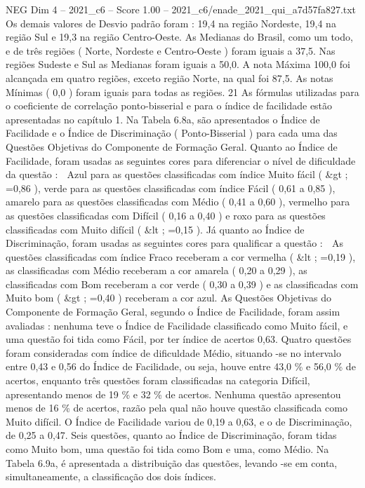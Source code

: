 \begin{textsample}{NEG Dim 4 – 2021\_c6 – Score 1.00 – 2021\_c6/enade\_2021\_qui\_a7d57fa827.txt}
Os demais valores de Desvio padrão foram : 19,4 na região Nordeste, 19,4 na região Sul e 19,3 na região Centro-Oeste.
As Medianas do Brasil, como um todo, e de três regiões ( Norte, Nordeste e Centro-Oeste ) foram iguais a 37,5.
Nas regiões Sudeste e Sul as Medianas foram iguais a 50,0.
A nota Máxima 100,0 foi alcançada em quatro regiões, exceto região Norte, na qual foi 87,5.
As notas Mínimas ( 0,0 ) foram iguais para todas as regiões. 21 As fórmulas utilizadas para o coeficiente de correlação ponto-bisserial e para o índice de facilidade estão apresentadas no capítulo 1.
Na Tabela 6.8a, são apresentados o Índice de Facilidade e o Índice de Discriminação ( Ponto-Bisserial ) para cada uma das Questões Objetivas do Componente de Formação Geral.
Quanto ao Índice de Facilidade, foram usadas as seguintes cores para diferenciar o nível de dificuldade da questão :  Azul para as questões classificadas com índice Muito fácil ( \&gt ; =0,86 ), verde para as questões classificadas com índice Fácil ( 0,61 a 0,85 ), amarelo para as questões classificadas com Médio ( 0,41 a 0,60 ), vermelho para as questões classificadas com Difícil ( 0,16 a 0,40 ) e roxo para as questões classificadas com Muito difícil ( \&lt ; =0,15 ).
Já quanto ao Índice de Discriminação, foram usadas as seguintes cores para qualificar a questão :  As questões classificadas com índice Fraco receberam a cor vermelha ( \&lt ; =0,19 ), as classificadas com Médio receberam a cor amarela ( 0,20 a 0,29 ), as classificadas com Bom receberam a cor verde ( 0,30 a 0,39 ) e as classificadas com Muito bom ( \&gt ; =0,40 ) receberam a cor azul.
As Questões Objetivas do Componente de Formação Geral, segundo o Índice de Facilidade, foram assim avaliadas : nenhuma teve o Índice de Facilidade classificado como Muito fácil, e uma questão foi tida como Fácil, por ter índice de acertos 0,63.
Quatro questões foram consideradas com índice de dificuldade Médio, situando -se no intervalo entre 0,43 e 0,56 do Índice de Facilidade, ou seja, houve entre 43,0 \% e 56,0 \% de acertos, enquanto três questões foram classificadas na categoria Difícil, apresentando menos de 19 \% e 32 \% de acertos.
Nenhuma questão apresentou menos de 16 \% de acertos, razão pela qual não houve questão classificada como Muito difícil.
O Índice de Facilidade variou de 0,19 a 0,63, e o de Discriminação, de 0,25 a 0,47.
Seis questões, quanto ao Índice de Discriminação, foram tidas como Muito bom, uma questão foi tida como Bom e uma, como Médio.
Na Tabela 6.9a, é apresentada a distribuição das questões, levando -se em conta, simultaneamente, a classificação dos dois índices.

\end{textsample}
